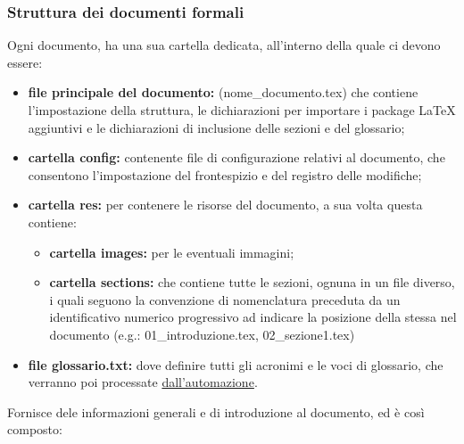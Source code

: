     \subsubsection{Struttura dei documenti formali}
            Ogni documento, ha una sua cartella dedicata, all'interno della quale ci devono essere:
            \begin{itemize}
                \item \textbf{file principale del documento: }(nome\_documento.tex) che contiene l'impostazione della struttura, le dichiarazioni per importare i package \LaTeX{} aggiuntivi e le dichiarazioni di inclusione delle sezioni e del glossario;
                \item \textbf{cartella config: }contenente file di configurazione relativi al documento, che consentono l'impostazione del frontespizio e del registro delle modifiche;
                \item \textbf{cartella res: }per contenere le risorse del documento, a sua volta questa contiene:
                    \begin{itemize}
                        \item \textbf{cartella images: }per le eventuali immagini;
                        \item \textbf{cartella sections: }che contiene tutte le sezioni, ognuna in un file diverso, i quali seguono la convenzione di nomenclatura preceduta da un identificativo numerico progressivo ad indicare la posizione della stessa nel documento (e.g.: 01\_introduzione.tex, 02\_sezione1.tex)
                    \end{itemize}
                \item \textbf{file glossario.txt: }dove definire tutti gli acronimi e le voci di glossario, che verranno poi processate \hyperref[glossario]{dall'automazione}.
            \end{itemize}
            Fornisce dele informazioni generali e di introduzione al documento, ed è così composto:
